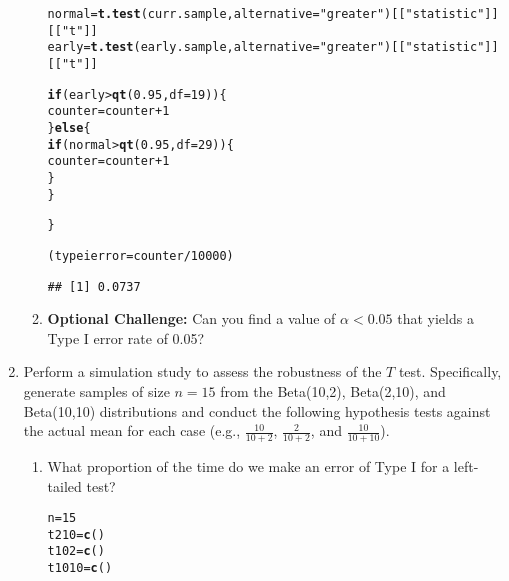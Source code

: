 \documentclass{article}\usepackage[]{graphicx}\usepackage[]{xcolor}
\makeatletter
\newcommand{\hlnum}[1]{\textcolor[rgb]{0.686,0.059,0.569}{#1}}%
\newcommand{\hlsng}[1]{\textcolor[rgb]{0.192,0.494,0.8}{#1}}%
\newcommand{\hlopt}[1]{\textcolor[rgb]{0,0,0}{#1}}%
\newcommand{\hldef}[1]{\textcolor[rgb]{0.345,0.345,0.345}{#1}}%
\newcommand{\hlkwa}[1]{\textcolor[rgb]{0.161,0.373,0.58}{\textbf{#1}}}%
\newcommand{\hlkwb}[1]{\textcolor[rgb]{0.69,0.353,0.396}{#1}}%
\newcommand{\hlkwc}[1]{\textcolor[rgb]{0.333,0.667,0.333}{#1}}%
\newcommand{\hlkwd}[1]{\textcolor[rgb]{0.737,0.353,0.396}{\textbf{#1}}}%
\newenvironment{kframe}{%
 \def\at@end@of@kframe{}%
 \ifinner\ifhmode%
  \def\at@end@of@kframe{\end{minipage}}%
  \begin{minipage}{\columnwidth}%
 \fi\fi%
 \def\FrameCommand##1{\hskip\@totalleftmargin \hskip-\fboxsep
 \colorbox{shadecolor}{##1}\hskip-\fboxsep
     \hskip-\linewidth \hskip-\@totalleftmargin \hskip\columnwidth}%
 \MakeFramed {\advance\hsize-\width
   \@totalleftmargin\z@ \linewidth\hsize
   \@setminipage}}%
 {\par\unskip\endMakeFramed%
 \at@end@of@kframe}
\newenvironment{knitrout}{}{} %
\makeatother
\begin{document}
\begin{enumerate}
\begin{enumerate}
\begin{knitrout}
\begin{kframe}
\begin{alltt}
\hldef{normal} \hlkwb{=} \hlkwd{t.test}\hldef{(curr.sample,} \hlkwc{alternative} \hldef{=} \hlsng{"greater"}\hldef{)[[}\hlsng{"statistic"}\hldef{]][[}\hlsng{"t"}\hldef{]]}
\hldef{early} \hlkwb{=} \hlkwd{t.test}\hldef{(early.sample,} \hlkwc{alternative} \hldef{=} \hlsng{"greater"}\hldef{)[[}\hlsng{"statistic"}\hldef{]][[}\hlsng{"t"}\hldef{]]}

\hlkwa{if} \hldef{(early} \hlopt{>} \hlkwd{qt}\hldef{(}\hlnum{0.95}\hldef{,} \hlkwc{df} \hldef{=} \hlnum{19}\hldef{)) \{}
  \hldef{counter} \hlkwb{=} \hldef{counter} \hlopt{+} \hlnum{1}
\hldef{\}} \hlkwa{else} \hldef{\{}
  \hlkwa{if} \hldef{(normal} \hlopt{>} \hlkwd{qt}\hldef{(}\hlnum{0.95}\hldef{,} \hlkwc{df} \hldef{=} \hlnum{29}\hldef{)) \{}
    \hldef{counter} \hlkwb{=} \hldef{counter} \hlopt{+} \hlnum{1}
  \hldef{\}}
\hldef{\}}


\hldef{\}}

\hldef{(typeierror} \hlkwb{=} \hldef{counter}\hlopt{/}\hlnum{10000}\hldef{)}
\end{alltt}
\begin{verbatim}
## [1] 0.0737
\end{verbatim}
\end{kframe}
\end{knitrout}
  \item \textbf{Optional Challenge:} Can you find a value of $\alpha<0.05$ that yields a 
  Type I error rate of 0.05?
\end{enumerate}
  \item Perform a simulation study to assess the robustness of the $T$ test. 
  Specifically, generate samples of size $n=15$ from the Beta(10,2), Beta(2,10), 
  and Beta(10,10) distributions and conduct the following hypothesis tests against 
  the actual mean for each case (e.g., $\frac{10}{10+2}$, $\frac{2}{10+2}$, and 
  $\frac{10}{10+10}$). 
  \begin{enumerate}
    \item What proportion of the time do we make an error of Type I for a
    left-tailed test?
\begin{knitrout}\scriptsize
{}\color{fgcolor}\begin{kframe}
\begin{alltt}
\hldef{n}\hlkwb{=}\hlnum{15}
\hldef{t210} \hlkwb{=} \hlkwd{c}\hldef{()}
\hldef{t102} \hlkwb{=} \hlkwd{c}\hldef{()}
\hldef{t1010} \hlkwb{=} \hlkwd{c}\hldef{()}


\end{alltt}
\end{kframe}
\end{knitrout}
\end{enumerate}
\end{enumerate}
\end{document}

